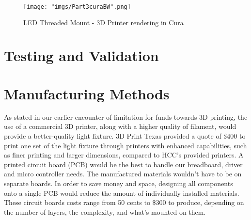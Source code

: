 \documentclass[12pt,a4paper]{report}
\begin{document}
\begin{figure}[H]
	\centering
	\texttt{[image: "imgs/Part3curaBW".png]}\par			\vspace{0.1cm}
	\caption{LED Threaded Mount - 3D Printer rendering in Cura}
\end{figure}

\section{Testing and Validation}

\section{Manufacturing Methods}
As stated in our earlier encounter of limitation for funds towards 3D printing, the use of a commercial 3D printer, along with a higher quality of filament, would provide a better-quality light fixture. 3D Print Texas provided a quote of \$400 to print one set of the light fixture through printers with enhanced capabilities, such as finer printing and larger dimensions, compared to HCC's provided printers.
A printed circuit board (PCB) would be the best to handle our breadboard, driver and micro controller needs. The manufactured materials wouldn't have to be on separate boards. In order to save money and space, designing all components onto a single PCB would reduce the amount of individually installed materials. These circuit boards costs range from 50 cents to \$300 to produce, depending on the number of layers, the complexity, and what's mounted on them.
\end{document}
